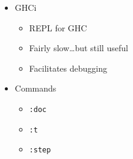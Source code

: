 \documentclass{article}
\begin{document}
	\begin{itemize}
		\item GHCi
		\begin{itemize}
			\item REPL for GHC
      \item Fairly slow\ldots but still useful
			\item Facilitates debugging
		\end{itemize}
		\item Commands
		\begin{itemize}
			\item \texttt{:doc}
			\item \texttt{:t}
			\item \texttt{:step}
		\end{itemize}
	\end{itemize}
\end{document}

